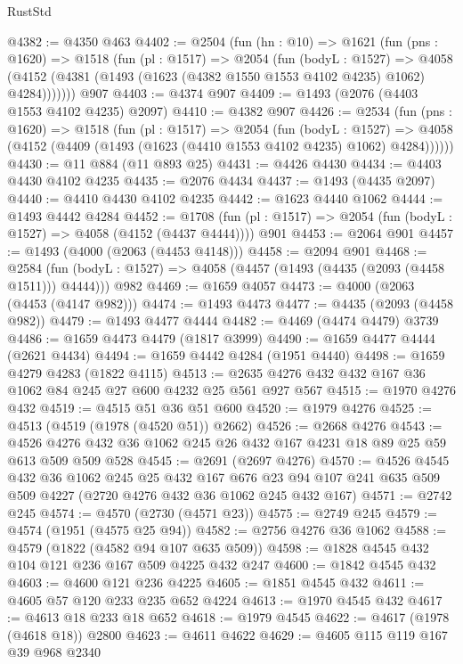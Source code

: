 \begin{lexlean}{RustStd}
\begin{coremodule}
@4382 := @4350 @463
@4402 := @2504
    (fun (hn : @10) =>
    @1621
      (fun (pns : @1620) =>
      @1518
        (fun (pl : @1517) =>
        @2054
          (fun (bodyL : @1527) =>
          @4058 (@4152 (@4381 (@1493 (@1623 (@4382 @1550 @1553 @4102 @4235) @1062) @4284)))))))
    @907
@4403 := @4374 @907
@4409 := @1493 (@2076 (@4403 @1553 @4102 @4235) @2097)
@4410 := @4382 @907
@4426 := @2534
    (fun (pns : @1620) =>
    @1518
      (fun (pl : @1517) =>
      @2054
        (fun (bodyL : @1527) =>
        @4058 (@4152 (@4409 (@1493 (@1623 (@4410 @1553 @4102 @4235) @1062) @4284))))))
@4430 := @11 @884 (@11 @893 @25)
@4431 := @4426 @4430
@4434 := @4403 @4430 @4102 @4235
@4435 := @2076 @4434
@4437 := @1493 (@4435 @2097)
@4440 := @4410 @4430 @4102 @4235
@4442 := @1623 @4440 @1062
@4444 := @1493 @4442 @4284
@4452 := @1708 (fun (pl : @1517) => @2054 (fun (bodyL : @1527) => @4058 (@4152 (@4437 @4444)))) @901
@4453 := @2064 @901
@4457 := @1493 (@4000 (@2063 (@4453 @4148)))
@4458 := @2094 @901
@4468 := @2584
    (fun (bodyL : @1527) => @4058 (@4457 (@1493 (@4435 (@2093 (@4458 @1511))) @4444)))
    @982
@4469 := @1659 @4057
@4473 := @4000 (@2063 (@4453 (@4147 @982)))
@4474 := @1493 @4473
@4477 := @4435 (@2093 (@4458 @982))
@4479 := @1493 @4477 @4444
@4482 := @4469 (@4474 @4479) @3739
@4486 := @1659 @4473 @4479 (@1817 @3999)
@4490 := @1659 @4477 @4444 (@2621 @4434)
@4494 := @1659 @4442 @4284 (@1951 @4440)
@4498 := @1659 @4279 @4283 (@1822 @4115)
@4513 := @2635 @4276 @432 @432 @167 @36 @1062 @84 @245 @27 @600 @4232 @25 @561 @927 @567
@4515 := @1970 @4276 @432
@4519 := @4515 @51 @36 @51 @600
@4520 := @1979 @4276
@4525 := @4513 (@4519 (@1978 (@4520 @51)) @2662)
@4526 := @2668 @4276
@4543 := @4526 @4276 @432 @36 @1062 @245 @26 @432 @167 @4231 @18 @89 @25 @59 @613 @509 @509 @528
@4545 := @2691 (@2697 @4276)
@4570 := @4526
    @4545
    @432
    @36
    @1062
    @245
    @25
    @432
    @167
    @676
    @23
    @94
    @107
    @241
    @635
    @509
    @509
    @4227
    (@2720 @4276 @432 @36 @1062 @245 @432 @167)
@4571 := @2742 @245
@4574 := @4570 (@2730 (@4571 @23))
@4575 := @2749 @245
@4579 := @4574 (@1951 (@4575 @25 @94))
@4582 := @2756 @4276 @36 @1062
@4588 := @4579 (@1822 (@4582 @94 @107 @635 @509))
@4598 := @1828 @4545 @432 @104 @121 @236 @167 @509 @4225 @432 @247
@4600 := @1842 @4545 @432
@4603 := @4600 @121 @236 @4225
@4605 := @1851 @4545 @432
@4611 := @4605 @57 @120 @233 @235 @652 @4224
@4613 := @1970 @4545 @432
@4617 := @4613 @18 @233 @18 @652
@4618 := @1979 @4545
@4622 := @4617 (@1978 (@4618 @18)) @2800
@4623 := @4611 @4622
@4629 := @4605 @115 @119 @167 @39 @968 @2340

\end{coremodule}
\end{lexlean}
